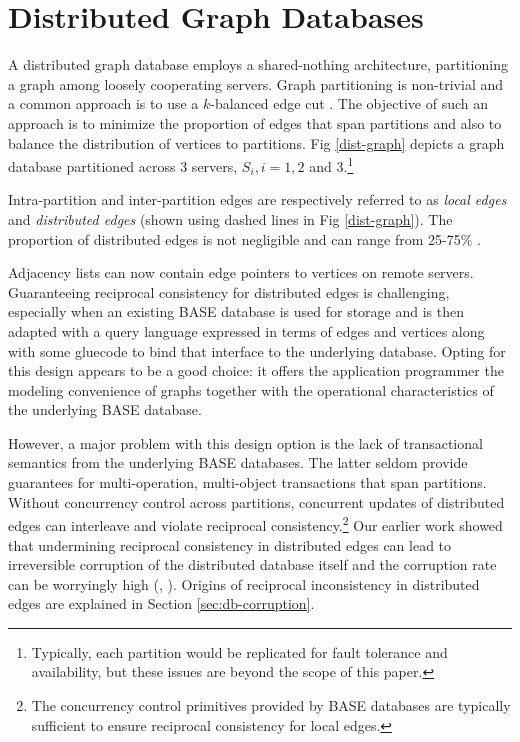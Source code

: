 \section{Distributed Graph Databases}
\label{sec:distr-graph-datab}

A distributed graph database employs a shared-nothing architecture, partitioning a graph among loosely cooperating servers.
Graph partitioning is non-trivial and a common approach is to use a $k$-balanced edge cut \cite{Huang2016}.
The objective of such an approach is to minimize the proportion of edges that span partitions and also to balance the distribution of vertices to partitions.
Fig \ref{dist-graph} depicts a graph database partitioned across 3 servers, $S_i, i = 1, 2$ and $3$.\footnote{Typically, each partition would be replicated for fault tolerance and availability, but these issues are beyond the scope of this paper.}

Intra-partition and inter-partition edges are respectively referred to as \textit{local edges}  and  \textit{distributed edges} (shown using dashed lines in Fig \ref{dist-graph}).
The proportion of distributed edges is not negligible and can range from 25-75\% \cite{Huang2016}.



Adjacency lists can now contain edge pointers to vertices on remote servers.
Guaranteeing reciprocal consistency for distributed edges is challenging, especially when an existing BASE database is used for storage and is then adapted with a query language expressed in terms of edges and vertices along with some gluecode to bind that interface to the underlying database.
Opting for this design appears to be a good choice: it offers the application programmer the modeling convenience of graphs together with the operational characteristics of the underlying BASE database.

However, a major problem with this design option is the lack of transactional semantics from the underlying BASE databases.
The latter seldom provide guarantees for multi-operation, multi-object transactions that span partitions. Without concurrency control across partitions, concurrent updates of distributed edges can interleave and violate reciprocal consistency.\footnote{The concurrency control primitives provided by BASE databases are typically sufficient to ensure reciprocal consistency for local edges.}
Our earlier work showed that undermining reciprocal consistency in distributed edges can lead to irreversible corruption of the distributed database itself and the corruption rate can be worryingly high (\cite{Ezhilchelvan2018}, \cite{Webber2019}).
Origins of reciprocal inconsistency in distributed edges are explained in Section \ref{sec:db-corruption}.


